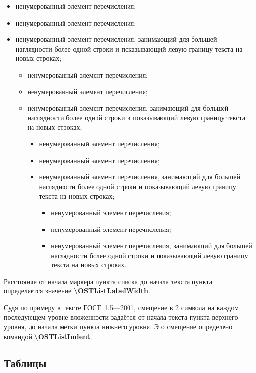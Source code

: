 \documentclass[12pt, twoside, final]{ruost}
\newcommand{\txtcmd}[1]{\textbf{\backslash{}#1}}
\begin{document}
\begin{OST}
				\begin{itemize}
					\item ненумерованный элемент перечисления;
					\item ненумерованный элемент перечисления;
					\item ненумерованный элемент перечисления, занимающий для большей наглядности более одной строки и показывающий левую границу текста на новых строках;
					\begin{itemize}
						\item ненумерованный элемент перечисления;
						\item ненумерованный элемент перечисления;
						\item ненумерованный элемент перечисления, занимающий для большей наглядности более одной строки и показывающий левую границу текста на новых строках;
						\begin{itemize}
							\item ненумерованный элемент перечисления;
							\item ненумерованный элемент перечисления;
							\item ненумерованный элемент перечисления, занимающий для большей наглядности более одной строки и показывающий левую границу текста на новых строках;
							\begin{itemize}
								\item ненумерованный элемент перечисления;
								\item ненумерованный элемент перечисления;
								\item ненумерованный элемент перечисления, занимающий для большей наглядности более одной строки и показывающий левую границу текста на новых строках.
							\end{itemize}
						\end{itemize}
					\end{itemize}
				\end{itemize}
				
				\point Расстояние от начала маркера пункта списка до начала текста пункта определяется значение \txtcmd{OSTListLabelWidth}.
				
				\point Судя по примеру в тексте ГОСТ~1.5---2001, смещение в 2 символа на каждом последующем уровне вложенности задаётся от начала текста пункта верхнего уровня, до начала метки пункта нижнего уровня. Это смещение определено командой \txtcmd{OSTListIndent}.
				
			\subsection{Таблицы}\label{sec:tables}
			

\end{OST}
\end{document}
